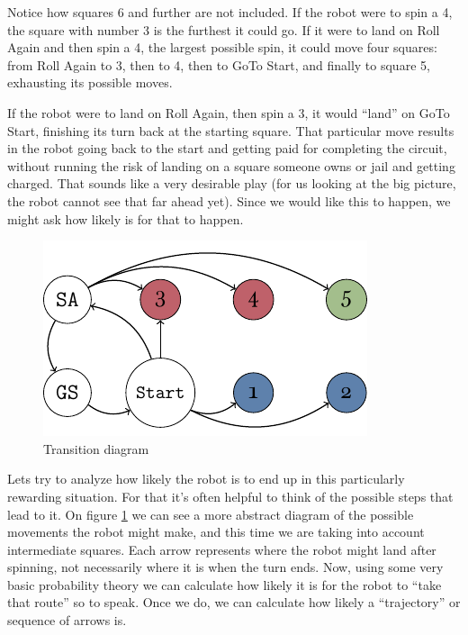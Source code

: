 Notice how squares 6 and further are not included.
If the robot were to spin a 4, the square with number 3 is the 
furthest it could go. If it were to land on Roll Again and then 
spin a 4, the largest possible spin, it could move four 
squares: from Roll Again to 3, then to 4, then to GoTo Start, 
and finally to square 5, exhausting its possible moves.

If the robot were to land on Roll Again, then spin a 3, it 
would ``land'' on GoTo Start, finishing its turn back at the 
starting square. That particular move results in the robot 
going back to the start and getting paid for completing the 
circuit, without running the risk of landing on a square 
someone owns or jail and getting charged. That sounds like a 
very desirable play (for us looking at the big picture, the 
robot cannot see that far ahead yet). Since we would like this 
to happen, we might ask how likely is for that to happen.

\begin{figure}[h]
	\centering
	\includegraphics[width=\textwidth]{img/transicion.pdf}
	\caption{Transition diagram}
	\label{fig:miniopoly-transicion}
\end{figure}

Lets try to analyze how likely the robot is to end up in this 
particularly rewarding situation. For that it's often helpful 
to think of the possible steps that lead to it. On figure 
\ref{fig:miniopoly-transicion} we can see a more abstract 
diagram of the possible movements the robot might make, and 
this time we are taking into account intermediate squares. Each 
arrow represents where the robot might land after spinning, not 
necessarily where it is when the turn ends. Now, using some 
very basic probability theory we can calculate how likely it is 
for the robot to ``take that route'' so to speak. Once we do, 
we can calculate how likely a ``trajectory'' or sequence of 
arrows is.


